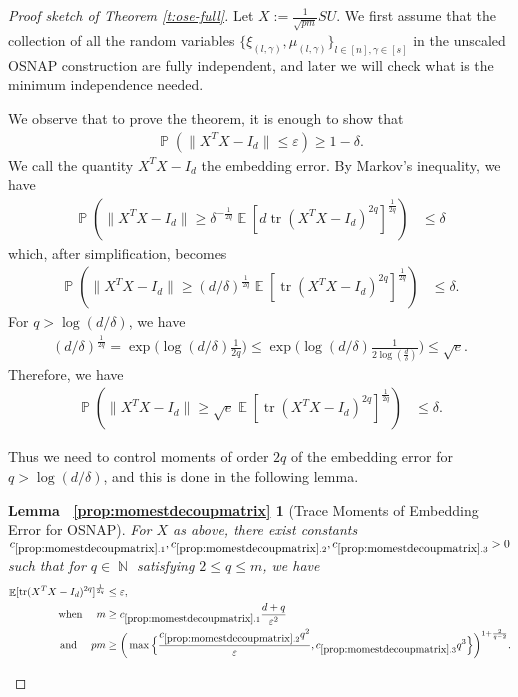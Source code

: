 \documentclass[11pt]{amsart}
\numberwithin{equation}{section}
\numberwithin{equation}{section}
\DeclareMathOperator{\E}{\mathbb{E}}
\DeclareMathOperator{\N}{\mathbb{N}}
\DeclareMathOperator{\Pb}{\mathbb{P}}
\DeclareMathOperator*{\tr}{tr}
\newtheorem*{osnaptracemom}{Lemma ~\ref{prop:momestdecoupmatrix}}
\theoremstyle{remark}
\theoremstyle{definition}
\begin{document}
\begin{proof}[Proof sketch of Theorem \ref{t:ose-full}]
    Let $X:= \frac{1}{\sqrt{pm}}SU$. We first assume that the collection of all the random variables 
$\{ \xi_{(l,\gamma)}, \mu_{(l,\gamma)} \}_{l \in [n], \gamma \in [s]}$ 
    in the unscaled OSNAP construction are fully independent, and later we will check what is the minimum independence needed.
    
    We observe that to prove the theorem, it is enough to show that
    \begin{align*} \Pb \left( \| X^TX - I_d \| \le \varepsilon \right) \ge 1-\delta. \end{align*}
We call the quantity $X^TX - I_d$ the embedding error. By Markov's inequality, we have
\begin{align*}
        \Pb \left( \| X^TX - I_d \| \ge \delta^{-\frac{1}{2q}} \E [d \tr (X^TX - I_d)^{2q}]^\frac{1}{2q} \right) &\le \delta
    \end{align*}
which, after simplification, becomes
\begin{align*}
        \Pb \left( \| X^TX - I_d \| \ge (d/\delta)^{\frac{1}{2q}} \E [ \tr (X^TX - I_d)^{2q}]^\frac{1}{2q} \right) &\le \delta.
    \end{align*}    
For $q> \log (d/\delta) $, we have
\begin{align*}
    (d/\delta)^{\frac{1}{2q}}=\exp\Big(\log(d/\delta)\frac{1}{2q}\Big) \le \exp\Big(\log(d/\delta)\frac{1}{2\log (\frac{d}{\delta})}\Big) \le {\sqrt{e}}.
\end{align*}
Therefore, we have
\begin{align*}
        \Pb \left( \| X^TX - I_d \| \ge \sqrt{e} \E [ \tr (X^TX - I_d)^{2q}]^\frac{1}{2q} \right) &\le \delta.
    \end{align*}

Thus we need to control moments of order $2q$ of the embedding error for $q>\log(d/\delta)$, and this is done in the following lemma.

\begin{osnaptracemom}[Trace Moments of Embedding Error for OSNAP]
    For $X$ as above, there exist constants $c_{\ref*{prop:momestdecoupmatrix}.1}, c_{\ref*{prop:momestdecoupmatrix}.2}, c_{\ref*{prop:momestdecoupmatrix}.3} > 0$ such that for $q \in \N$ satisfying $2 \le q \le m$, we have
\begin{align}
    \E[\tr(X^TX - I_d)^{2q}]^\frac{1}{2q} &\leq  \varepsilon,\nonumber\\
\text{when }\quad    m &\geq c_{\ref*{prop:momestdecoupmatrix}.1} \frac{d+q}{\varepsilon^2}  \label{ose-cond1}\\
    \text{and } \quad pm &\ge \bigg(\max\Big\{\frac{c_{\ref*{prop:momestdecoupmatrix}.2} q^{2}}{\varepsilon}, c_{\ref*{prop:momestdecoupmatrix}.3} q^3\Big\}\bigg)^{1+\frac{2}{q-2}}. \label{ose-cond2}    
\end{align} 
\end{osnaptracemom}


\end{proof}
\end{document}
